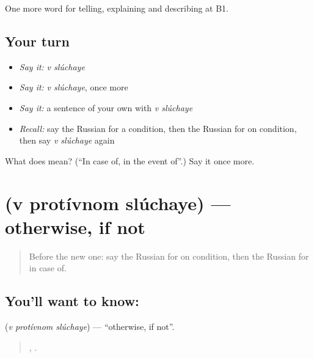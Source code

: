 \begin{grammarlens}[title={What you've built}]
One more word for telling, explaining and describing at B1.
\end{grammarlens}

\subsection*{Your turn}
\begin{itemize}
\raggedright
  \item \emph{Say it:} \emph{v slúchaye}
  \item \emph{Say it:} \emph{v slúchaye}, once more
  \item \emph{Say it:} a sentence of your own with \emph{v slúchaye}
  \item \emph{Recall:} say the Russian for a condition, then the Russian for on condition, then say \emph{v slúchaye} again
\end{itemize}

\begin{tcolorbox}[breakable,colback=teal!4,colframe=teal!35!black,title={Before you move on}]
What does   mean? (\textquotedblleft{}In case of, in the event of\textquotedblright{}.) Say it once more.
\end{tcolorbox}
\section[\texorpdfstring{\ru{в} \ru{противном} \ru{случае} (v protívnom …)}{в противном случае (v protívnom …)}]{   (v protívnom slúchaye) — otherwise, if not}

\label{lesson:RU-C370-v-protivnom-sluchae}



\begin{quote}
Before the new one: say the Russian for on condition, then the Russian for in case of.
\end{quote}

\subsection*{You'll want to know:   }
\textbf{  } (\emph{v protívnom slúchaye}) — \textquotedblleft{}otherwise, if not\textquotedblright{}.

\begin{quote}
  ,     .
\end{quote}

